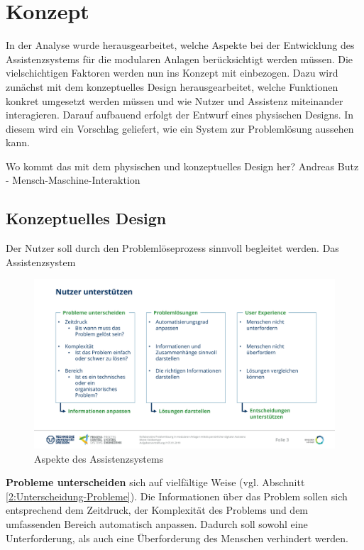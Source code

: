 \chapter{Konzept}
\label{sec:Konzept}
In der Analyse wurde herausgearbeitet, welche Aspekte bei der Entwicklung des Assistenzsystems für die modularen Anlagen berücksichtigt werden müssen. Die vielschichtigen Faktoren werden nun ins Konzept mit einbezogen. Dazu wird zunächst mit dem konzeptuelles Design herausgearbeitet, welche Funktionen konkret umgesetzt werden müssen und wie Nutzer und Assistenz miteinander interagieren. Darauf aufbauend erfolgt der Entwurf eines physischen Designs. In diesem wird ein Vorschlag geliefert, wie ein System zur Problemlösung aussehen kann.

Wo kommt das mit dem physischen und konzeptuelles Design her? Andreas Butz - Mensch-Maschine-Interaktion 

\section{Konzeptuelles Design}
Der Nutzer soll durch den Problemlöseprozess sinnvoll begleitet werden. Das Assistenzsystem 

\begin{figure}[htbp]
\centering
\includegraphics[scale=0.45]{DA_files/Bilder/Konzept/Nutzer-unterstuetzen.pdf}
\caption{Aspekte des Assistenzsystems}
\label{pic:Nutzer-Unterstuetzen}
\end{figure}

\textbf{Probleme unterscheiden} sich auf vielfältige Weise (vgl. Abschnitt \ref{2:Unterscheidung-Probleme}). Die Informationen über das Problem sollen sich entsprechend dem Zeitdruck, der Komplexität des Problems und dem umfassenden Bereich automatisch anpassen. Dadurch soll sowohl eine Unterforderung, als auch eine Überforderung des Menschen verhindert werden.

